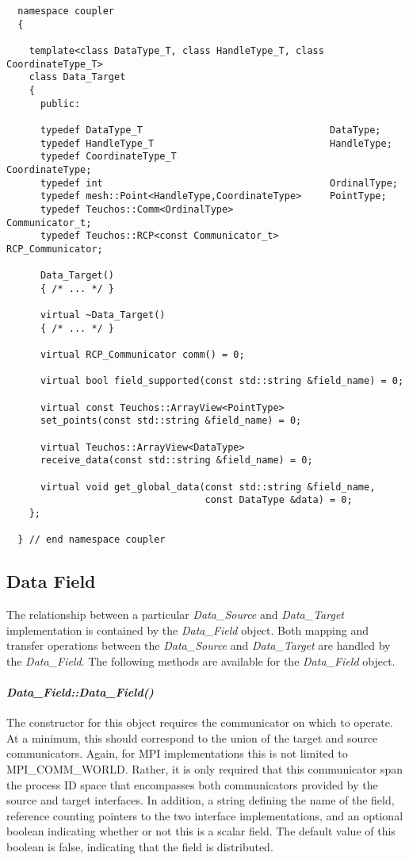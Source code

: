 \documentclass[letterpaper]{article}
\begin{document}
\begin{lstlisting}
  namespace coupler
  {

    template<class DataType_T, class HandleType_T, class CoordinateType_T>
    class Data_Target 
    {
      public:

      typedef DataType_T                                 DataType;
      typedef HandleType_T                               HandleType;
      typedef CoordinateType_T                           CoordinateType;
      typedef int                                        OrdinalType;
      typedef mesh::Point<HandleType,CoordinateType>     PointType;
      typedef Teuchos::Comm<OrdinalType>                 Communicator_t;
      typedef Teuchos::RCP<const Communicator_t>         RCP_Communicator;

      Data_Target()
      { /* ... */ }

      virtual ~Data_Target()
      { /* ... */ }

      virtual RCP_Communicator comm() = 0;

      virtual bool field_supported(const std::string &field_name) = 0;

      virtual const Teuchos::ArrayView<PointType> 
      set_points(const std::string &field_name) = 0;

      virtual Teuchos::ArrayView<DataType> 
      receive_data(const std::string &field_name) = 0;

      virtual void get_global_data(const std::string &field_name,
                                   const DataType &data) = 0;
    };

  } // end namespace coupler
\end{lstlisting}

\subsection{Data Field}
The relationship between a particular {\sl Data\_Source} and {\sl
  Data\_Target} implementation is contained by the {\sl Data\_Field}
object. Both mapping and transfer operations between the {\sl
  Data\_Source} and {\sl Data\_Target} are handled by the {\sl
  Data\_Field}. The following methods are available for the {\sl
  Data\_Field} object.

\paragraph{\sl Data\_Field::Data\_Field()}
The constructor for this object requires the communicator on which to
operate. At a minimum, this should correspond to the union of the
target and source communicators. Again, for MPI implementations this
is not limited to MPI\_COMM\_WORLD. Rather, it is only required that
this communicator span the process ID space that encompasses both
communicators provided by the source and target interfaces. In
addition, a string defining the name of the field, reference counting
pointers to the two interface implementations, and an optional boolean
indicating whether or not this is a scalar field. The default value of
this boolean is false, indicating that the field is distributed.
\end{document}
